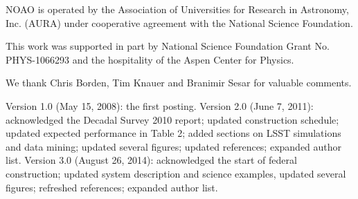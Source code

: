 \documentclass{emulateapj}
\begin{document}
NOAO is operated by the Association of Universities for Research in Astronomy,
Inc. (AURA) under cooperative agreement with the National Science Foundation.

This work was supported in part by National Science Foundation Grant No. PHYS-1066293 
and the hospitality of the Aspen Center for Physics.

We thank Chris Borden, Tim Knauer and Branimir Sesar for valuable comments.



\vskip 0.06in
Version 1.0 (May 15, 2008): the first posting. 
\vskip 0.06in
Version 2.0 (June 7, 2011): acknowledged the Decadal Survey 2010 report; updated construction schedule;
updated expected performance in Table 2; added sections on LSST simulations and data mining;
updated several figures; updated references; expanded author list. 
\vskip 0.06in
Version 3.0 (August 26, 2014): acknowledged the start of federal construction;
updated system description and science examples, updated several figures; refreshed references;
expanded author list. 
\end{document}

